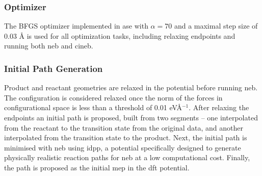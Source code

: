 \documentclass[twoside,twocolumn]{article}
\begin{document}
\subsubsection*{Optimizer}
The BFGS optimizer \cite{bfgs} implemented in \gls{ase}\cite{ase} with $\alpha=70$ and a maximal step size of 0.03 Å is used for all optimization tasks, including relaxing endpoints and running both \gls{neb} and \gls{cineb}.

\subsubsection*{Initial Path Generation}
Product and reactant geometries are relaxed in the potential before running \gls{neb}. The configuration is considered relaxed once the norm of the forces in configurational space is less than a threshold of 0.01 eVÅ$^{-1}$. After relaxing the endpoints an initial path is proposed, built from two segments -- one interpolated from the reactant to the transition state from the original data, and another interpolated from the transition state to the product. Next, the initial path is minimised with \gls{neb} using \gls{idpp}\cite{idpp}, a potential specifically designed to generate physically realistic reaction paths for \gls{neb} at a low computational cost. Finally, the path is proposed as the initial \gls{mep} in the \gls{dft} potential. 
\end{document}
